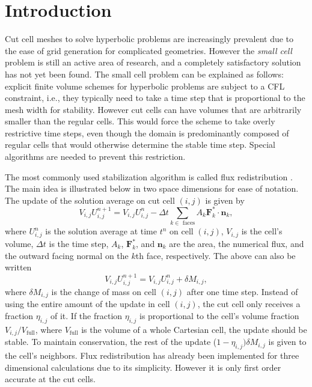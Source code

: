 \section{Introduction}\label{sec:intro}
Cut cell meshes to solve hyperbolic problems 
are increasingly prevalent due to the ease 
of grid generation for complicated geometries. 
However the {\em small cell} problem is still an active area of research, and
a completely satisfactory solution has not yet been found.
The small cell problem can be explained as follows: explicit
finite volume schemes for hyperbolic problems are subject to a CFL constraint, i.e.,  they typically need to take a time step that is proportional to the mesh width for
stability. However cut cells can have volumes that are arbitrarily smaller than the regular cells.  This would force the scheme to take overly restrictive time steps, even though the domain is predominantly composed of regular cells that would otherwise determine the stable time step. Special algorithms are needed to prevent this restriction.

The most commonly used stabilization algorithm is called flux
redistribution \cite{chern:colella,vof:colella}. The main idea is illustrated below in two space
dimensions for ease of notation.
The update of the solution average on cut cell $(i,j)$ is given by
\begin{equation*}
V_{i,j} U_{i,j} ^{n+1}  = V_{i,j} U_{i,j}^n  -  \Delta t \sum_{k \in \text{ faces}}A_k \mathbf{F}_k^* \cdot \mathbf{n}_k,
\end{equation*}
where $U^n_{i,j}$ is the solution average at time $t^n$ on cell $(i,j)$, $V_{i,j}$ is the cell's volume,  $\Delta t$ is the time step, $A_k$, $\mathbf{F}_k^*$, and $\mathbf{n}_k$ are the area, the numerical flux, and the outward facing normal on the $k$th face, respectively.
The above can also be written
\begin{equation*}
V_{i,j} U_{i,j} ^{n+1} = V_{i,j} U_{i,j}^n  +  \delta  M_{i,j} ,
\end{equation*}
where $\delta M_{i,j}$ is the change of mass on cell $(i,j)$ after one time step.
Instead of using the entire amount of the update in cell $(i,j)$, 
the cut cell only receives a fraction $\eta_{i,j}$ of it.  If the fraction $\eta_{i,j}$
is proportional to the cell's volume fraction $V_{i,j}/V_{\text{full}}$, where $V_{\text{full}}$ is the volume of a whole Cartesian cell, the update should be stable. 
To maintain conservation, the rest of the update ($1-\eta_{i,j})\delta M_{i,j}$
is given to the cell's neighbors.  
Flux redistribution has already been implemented for three dimensional
calculations due to its simplicity. However it is only first order accurate at the cut cells.

